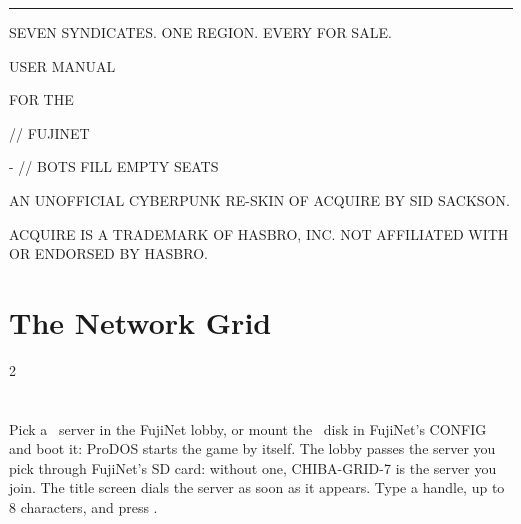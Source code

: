 \documentclass[12pt,letterpaper]{article}
\begin{document}
\begin{titlepage}
\machine
\vspace*{1.6in}
{\color{amber}\rule{\linewidth}{2pt}}\par\vspace{14pt}
{\fontsize{44}{48}\selectfont \game\par}\vspace{10pt}
{\fontsize{12}{16}\selectfont\color{steel} SEVEN SYNDICATES. ONE REGION. EVERY \MakeUppercase{} FOR SALE.\par}
\vspace{14pt}{\color{amber}\rule{\linewidth}{2pt}}\par
\vspace{0.35in}
{\fontsize{24}{30}\selectfont USER MANUAL\par}\vspace{4pt}
{\fontsize{14}{18}\selectfont\color{amber} FOR THE \MakeUppercase{\PlatformLong}\par}
\vspace{0.4in}
{\fontsize{12}{16}\selectfont \PlatformMachines \quad // \quad FUJINET\par
{}- \MakeUppercase{} \quad // \quad BOTS FILL EMPTY SEATS\par}
\vfill
{\fontsize{8.5}{11}\selectfont\color{steel}
AN UNOFFICIAL CYBERPUNK RE-SKIN OF ACQUIRE BY SID SACKSON.\par
ACQUIRE IS A TRADEMARK OF HASBRO, INC. NOT AFFILIATED WITH OR ENDORSED BY HASBRO.\par}
\end{titlepage}

\renewcommand{\secstatus}{THE SETTING \quad // \quad THE OBJECT \quad // \quad THE END}
\chapter{The Network Grid}
\begin{multicols}{2}
\end{multicols}

\renewcommand{\secstatus}{REGION \quad // \quad STATUS \quad // \quad HANDLE}
\chapter{}
Pick a \game\ server in the FujiNet lobby, or mount the \game\ disk in FujiNet's CONFIG and boot it: ProDOS
starts the game by itself. The lobby passes the server you pick through FujiNet's SD card: without one,
CHIBA-GRID-7 is the server you join. The title screen dials the server as soon as it appears. Type a handle, up to 8
characters, and press .
\end{document}
